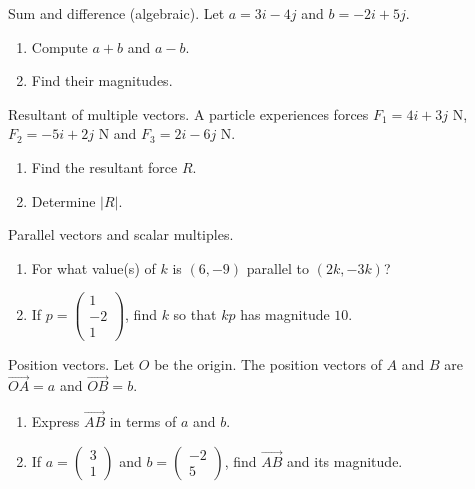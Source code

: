 \documentclass[11pt]{article}
\def\textbf#1{#1}%
\def\mathbf#1{#1}%
\newcounter{question}
\begin{document}
\begin{question}
\textbf{Sum and difference (algebraic).}
Let $\mathbf{a}=3\mathbf{i}-4\mathbf{j}$ and $\mathbf{b}=-2\mathbf{i}+5\mathbf{j}$.
\begin{enumerate}
  \item Compute $\mathbf{a}+\mathbf{b}$ and $\mathbf{a}-\mathbf{b}$.
  \item Find their magnitudes.
\end{enumerate}
\end{question}

\begin{question}
\textbf{Resultant of multiple vectors.}
A particle experiences forces $\mathbf{F}_1=4\mathbf{i}+3\mathbf{j}$ N, $\mathbf{F}_2=-5\mathbf{i}+2\mathbf{j}$ N and $\mathbf{F}_3=2\mathbf{i}-6\mathbf{j}$ N.
\begin{enumerate}
  \item Find the resultant force $\mathbf{R}$.
  \item Determine $|\mathbf{R}|$.
\end{enumerate}
\end{question}

\begin{question}
\textbf{Parallel vectors and scalar multiples.}
\begin{enumerate}
  \item For what value(s) of $k$ is $(6,-9)$ parallel to $(2k,-3k)$?
  \item If $\mathbf{p}=\begin{pmatrix}1\\-2\\1\end{pmatrix}$, find $k$ so that $k\mathbf{p}$ has magnitude $10$.
\end{enumerate}
\end{question}

\begin{question}
\textbf{Position vectors.}
Let $O$ be the origin. The position vectors of $A$ and $B$ are $\overrightarrow{OA}=\mathbf{a}$ and $\overrightarrow{OB}=\mathbf{b}$.
\begin{enumerate}
  \item Express $\overrightarrow{AB}$ in terms of $\mathbf{a}$ and $\mathbf{b}$.
  \item If $\mathbf{a}=\begin{pmatrix}3\\1\end{pmatrix}$ and $\mathbf{b}=\begin{pmatrix}-2\\5\end{pmatrix}$, find $\overrightarrow{AB}$ and its magnitude.
\end{enumerate}
\end{question}
\end{document}

